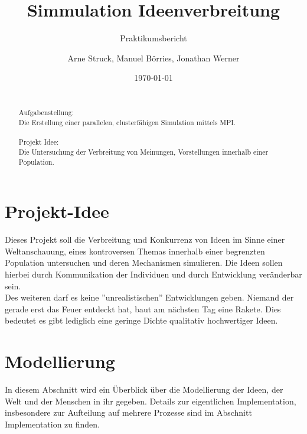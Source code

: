 \title{Simmulation Ideenverbreitung}
\subtitle{Praktikumsbericht}

\author{Arne Struck, Manuel Börries, Jonathan Werner}

  
\date{\today}

\maketitle


\begin{abstract}
\quad \\
Aufgabenstellung: \\
Die Erstellung einer parallelen, clusterfähigen Simulation mittels MPI. \\ \\
Projekt Idee: \\
Die Untersuchung der Verbreitung von Meinungen, Vorstellungen innerhalb einer Population.
\end{abstract}

\tableofcontents
\newpage
\section{Projekt-Idee}
Dieses Projekt soll die Verbreitung und Konkurrenz von Ideen im Sinne einer Weltanschauung, eines kontroversen Themas innerhalb einer begrenzten Population untersuchen und deren Mechanismen simulieren. 
Die Ideen sollen hierbei durch Kommunikation der Individuen und durch Entwicklung veränderbar sein. \\
Des weiteren darf es keine ''unrealistischen'' Entwicklungen geben. 
Niemand der gerade erst das Feuer entdeckt hat, baut am nächsten Tag eine Rakete. Dies bedeutet es gibt lediglich eine geringe Dichte qualitativ hochwertiger Ideen.

\section{Modellierung}
In diesem Abschnitt wird ein Überblick über die Modellierung der Ideen, der Welt und der Menschen in ihr gegeben. 
Details zur eigentlichen Implementation, insbesondere zur Aufteilung auf mehrere Prozesse sind im Abschnitt Implementation zu finden.
